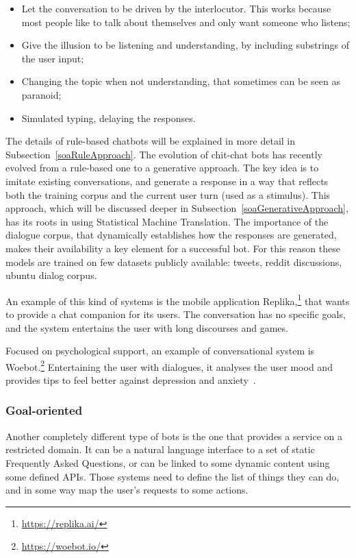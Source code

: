 \begin{itemize}
	\item Let the conversation to be driven by the interlocutor. This works because most people like to talk about themselves and only want someone who listens;
	\item Give the illusion to be listening and understanding, by including substrings of the user input;
	\item Changing the topic when not understanding, that sometimes can be seen as paranoid;
	\item Simulated typing, delaying the responses.
\end{itemize}
The details of rule-based chatbots will be explained in more detail in Subsection~\ref{soaRuleApproach}.
The evolution of chit-chat bots has recently evolved from a rule-based one to a generative approach. The key idea is to imitate existing conversations, and generate a response in a way that reflects both the training corpus and the current user turn (used as a stimulus). This approach, which will be discussed deeper in Subsection~\ref{soaGenerativeApproach}, has its roots in using Statistical Machine Translation. The importance of the dialogue corpus, that dynamically establishes how the responses are generated, makes their availability a key element for a successful bot. For this reason these models are trained on few datasets publicly available: tweets, reddit discussions, ubuntu dialog corpus.

An example of this kind of systems is the mobile application Replika,\footnote{\url{https://replika.ai/}} that wants to provide a chat companion for its users. The conversation has no specific goals, and the system entertains the user with long discourses and games.

Focused on psychological support, an example of conversational system is Woebot.\footnote{\url{https://woebot.io/}} Entertaining the user with dialogues, it analyses the user mood and provides tips to feel better against depression and anxiety~\cite{fitzpatrick2017delivering}.

\subsubsection{Goal-oriented}
Another completely different type of bots is the one that provides a service on a restricted domain. It can be a natural language interface to a set of static Frequently Asked Questions, or can be linked to some dynamic content using some defined APIs. Those systems need to define the list of things they can do, and in some way map the user's requests to some actions.

